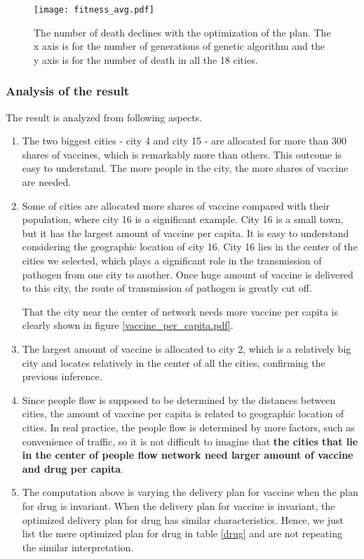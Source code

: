 \begin{figure}
	\centering
	\texttt{[image: fitness\_avg.pdf]}
	\caption{The number of death declines with the optimization of the plan. The x axis is for the number of generations of genetic algorithm and the y axis is for the number of death in all the 18 cities.}
	\label{fitness_avg}
\end{figure}

\subsubsection{Analysis of the result}
The result is analyzed from following aspects.
\begin{enumerate}
	\item The two biggest cities - city 4 and city 15 - are allocated for more than 300 shares of vaccines, which is remarkably more than others. This outcome is easy to understand. The more people in the city, the more shares of vaccine are needed.
	\item Some of cities are allocated more shares of vaccine compared with their population, where city 16 is a significant example. City 16 is a small town, but it has the largest amount of vaccine per capita. It is easy to understand considering the geographic location of city 16. City 16 lies in the center of the cities we selected, which plays a significant role in the transmission of pathogen from one city to another. Once huge amount of vaccine is delivered to this city, the route of transmission of pathogen is greatly cut off.

	      That the city near the center of network needs more vaccine per capita is clearly shown in figure \ref{vaccine_per_capita.pdf}.
	\item The largest amount of vaccine is allocated to city 2, which is a relatively big city and locates relatively in the center of all the cities, confirming the previous inference.
	\item Since people flow is supposed to be determined by the distances between cities, the amount of vaccine per capita is related to geographic location of cities. In real practice, the people flow is determined by more factors, such as convenience of traffic, so it is not difficult to imagine that \textbf{the cities that lie in the center of people flow network need larger amount of vaccine and drug per capita}.
	\item The computation above is varying the delivery plan for vaccine when the plan for drug is invariant. When the delivery plan for vaccine is invariant, the optimized delivery plan for drug has similar characteristics. Hence, we just list the mere optimized plan for drug in table \ref{drug} and are not repeating the similar interpretation.
\end{enumerate}


